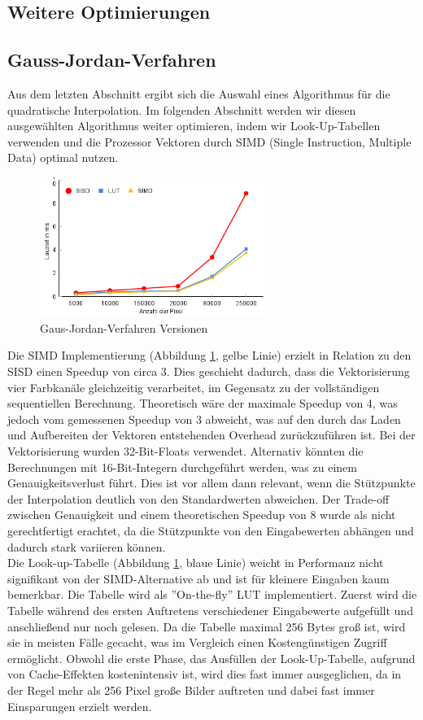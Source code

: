 \documentclass[course=erap]{aspdoc}
\begin{document}
\subsection{Weitere Optimierungen}

\subsection*{Gauss-Jordan-Verfahren}
Aus dem letzten Abschnitt ergibt sich die Auswahl eines Algorithmus für die quadratische Interpolation. Im folgenden Abschnitt werden wir diesen ausgewählten Algorithmus weiter optimieren, indem wir Look-Up-Tabellen verwenden und die Prozessor Vektoren durch SIMD (Single Instruction, Multiple Data) optimal nutzen.
\begin{figure}[H]
  \centering
  \includegraphics[width=0.65\textwidth]{quadOpt.png}
  \caption{Gaus-Jordan-Verfahren Versionen}
  \label{fig:quadopt}
\end{figure}
Die SIMD Implementierung (Abbildung \ref{fig:quadopt}, gelbe Linie) erzielt in Relation zu den SISD einen Speedup von circa 3. Dies geschieht dadurch, dass die Vektorisierung vier Farbkanäle gleichzeitig verarbeitet, im Gegensatz zu der vollständigen sequentiellen Berechnung. Theoretisch wäre der maximale Speedup von 4, was jedoch vom gemessenen Speedup von 3 abweicht, was auf den durch das Laden und Aufbereiten der Vektoren entstehenden Overhead zurückzuführen ist. Bei der Vektorisierung wurden 32-Bit-Floats verwendet. Alternativ könnten die Berechnungen mit 16-Bit-Integern durchgeführt werden, was zu einem Genauigkeitsverlust führt. Dies ist vor allem dann relevant, wenn die Stützpunkte der Interpolation deutlich von den Standardwerten abweichen. Der Trade-off zwischen Genauigkeit und einem theoretischen Speedup von 8 wurde als nicht gerechtfertigt erachtet, da die Stützpunkte von den Eingabewerten abhängen und dadurch stark variieren können.\\ 
Die Look-up-Tabelle (Abbildung \ref{fig:quadopt}, blaue Linie) weicht in Performanz nicht signifikant von der SIMD-Alternative ab und ist für kleinere Eingaben kaum bemerkbar. Die Tabelle wird als ”On-the-fly”  LUT implementiert. Zuerst wird die Tabelle während des ersten Auftretens verschiedener Eingabewerte aufgefüllt und anschließend nur noch gelesen. Da die Tabelle maximal 256 Bytes groß ist, wird sie in meisten Fälle  gecacht, was im Vergleich einen Kostengünstigen Zugriff ermöglicht. Obwohl die erste Phase, das Ausfüllen der Look-Up-Tabelle, aufgrund von Cache-Effekten kostenintensiv ist, wird dies fast immer ausgeglichen, da in der Regel mehr als 256 Pixel große Bilder auftreten und dabei fast immer Einsparungen erzielt werden. 
\end{document}
